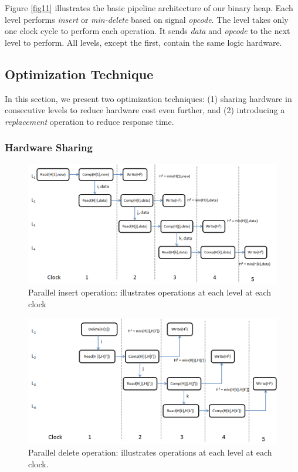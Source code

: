 \documentclass[10pt, conference, compsocconf]{IEEEtran}
\begin{document}
Figure \ref{fig11} illustrates the basic pipeline architecture of our binary heap.
Each level performs {\it insert} or {\it min-delete} based on signal {\it opcode}.
The level takes only one clock cycle to perform each operation.
It sends {\it data} and {\it opcode} to the next level to perform.
All levels, except the first, contain the same logic hardware.


\subsection{Optimization Technique}

In this section, we present two optimization techniques: (1) sharing hardware in consecutive levels to reduce hardware cost even further, and (2) introducing a {\it replacement} operation to reduce response time.

\subsubsection{Hardware Sharing}

\begin{figure}[!ht]
  \centering
  \includegraphics[width=12cm]{Figures/clock1.png}
      \caption{Parallel insert operation: illustrates operations at each level at each clock }
    \label{clock1}
\end{figure}

\begin{figure}[!ht]
  \centering
  \includegraphics[width=12cm]{Figures/clock2.png}
      \caption{Parallel delete operation: illustrates operations at each level at each clock.  }
    \label{clock2}
\end{figure}
\end{document}
